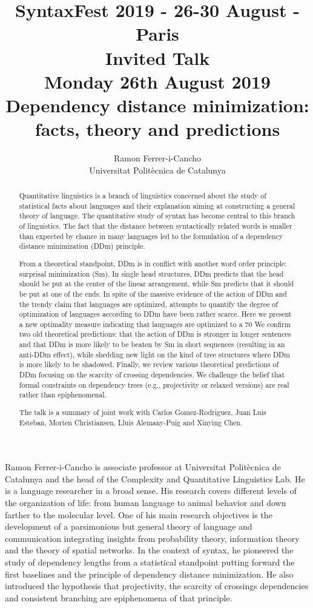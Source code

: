 \documentclass[11pt]{article}
\title{{\footnotesize SyntaxFest 2019 - 26-30 August - Paris}\\
\vspace{10mm}
 Invited Talk\\
  {\small Monday 26th August 2019}\\
  Dependency distance minimization: facts, theory and predictions}
\author{Ramon Ferrer-i-Cancho\\
  Universitat Politècnica de Catalunya}
\begin{document}
\maketitle
\begin{abstract}
  Quantitative linguistics is a branch of linguistics concerned about the study of statistical facts about languages and their explanation aiming at constructing a general theory of language. The quantitative study of syntax has become central to this branch of linguistics. The fact that the distance between syntactically related words is smaller than expected by chance in many languages led to the formulation of a dependency distance minimization (DDm) principle.
  
From a theoretical standpoint, DDm is in conflict with another word order principle: surprisal minimization (Sm). In single head structures, DDm predicts that the head should be put at the center of the linear arrangement, while Sm predicts that it should be put at one of the ends.  In spite of the massive evidence of the action of DDm and the trendy claim that languages are optimized, attempts to quantify the degree of optimization of languages according to DDm have been rather scarce. Here we present a new optimality measure indicating that languages are optimized to a 70%
We confirm two old theoretical predictions: that the action of DDm is stronger in longer sentences and that DDm is more likely to be beaten by Sm in short sequences (resulting in an anti-DDm effect), while shedding new light on the kind of tree structures where DDm is more likely to be shadowed. Finally, we review various theoretical predictions of DDm focusing on the scarcity of crossing dependencies. We challenge the belief that formal constraints on dependency trees (e.g., projectivity or relaxed versions) are real rather than epiphenomenal.

The talk is a summary of joint work with Carlos Gomez-Rodriguez, Juan Luis Esteban, Morten Christiansen, Lluis Alemany-Puig and Xinying Chen.
\end{abstract}

\vspace{4mm}
\begin{shortbio}
Ramon Ferrer-i-Cancho is associate professor at Universitat Politècnica de Catalunya and the head of the Complexity and Quantitative Linguistics Lab. He is a language researcher in a broad sense. His research covers different levels of the organization of life: from human language to animal behavior and down farther to the molecular level. One of his main research objectives is the development of a parsimonious but general theory of language and communication integrating insights from probability theory, information theory and the theory of spatial networks. In the context of syntax, he pioneered the study of dependency lengths from a statistical standpoint putting forward the first baselines and the principle of dependency distance minimization. He also introduced the hypothesis that projectivity, the scarcity of crossings dependencies and consistent branching are epiphenomena of that principle. 
\end{shortbio}
\end{document}
